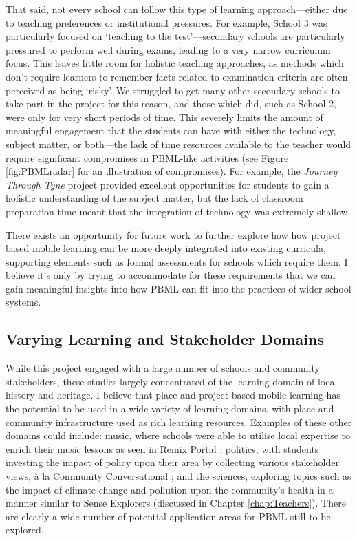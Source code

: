 That said, not every school can follow this type of learning approach---either due to teaching preferences or institutional pressures. For example, School 3 was particularly focused on `teaching to the test'---secondary schools are particularly pressured to perform well during exams, leading to a very narrow curriculum focus. This leaves little room for holistic teaching approaches, as methods which don't require learners to remember facts related to examination criteria are often perceived as being `risky'. We struggled to get many other secondary schools to take part in the project for this reason, and those which did, such as School 2, were only for very short periods of time. This severely limits the amount of meaningful engagement that the students can have with either the technology, subject matter, or both---the lack of time resources available to the teacher would require significant compromises in PBML-like activities (see Figure \ref{fig:PBMLradar} for an illustration of compromises). For example, the \textit{Journey Through Tyne} project provided excellent opportunities for students to gain a holistic understanding of the subject matter, but the lack of classroom preparation time meant that the integration of technology was extremely shallow.

There exists an opportunity for future work to further explore how how project based mobile learning can be more deeply integrated into existing curricula, supporting elements such as formal assessments for schools which require them. I believe it's only by trying to accommodate for these requirements that we can gain meaningful insights into how PBML can fit into the practices of wider school systems. 

\subsection*{Varying Learning and Stakeholder Domains}

While this project engaged with a large number of schools and community stakeholders, these studies largely concentrated of the learning domain of local history and heritage. I believe that place and project-based mobile learning has the potential to be used in a wide variety of learning domains, with place and community infrastructure used as rich learning resources. Examples of these other domains could include: music, where schools were able to utilise local expertise to enrich their music lessons as seen in Remix Portal \citep{Dodds2017}; politics, with students investing the impact of policy upon their area by collecting various stakeholder views, \`a la Community Conversational \citep{Johnson2017}; and the sciences, exploring topics such as the impact of climate change and pollution upon the community's health in a manner similar to Sense Explorers (discussed in Chapter \ref{chap:Teachers}). There are clearly a wide number of potential application areas for PBML still to be explored.

